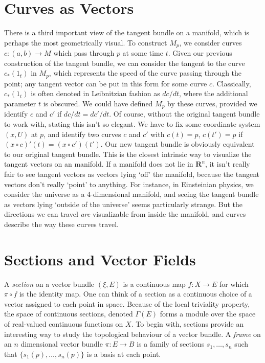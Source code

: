 \section{Curves as Vectors}

There is a third important view of the tangent bundle on a manifold, which is perhaps the most geometrically visual. To construct $M_p$, we consider curves $c: (a,b) \to M$ which pass through $p$ at some time $t$. Given our previous construction of the tangent bundle, we can consider the tangent to the curve $c_*(1_t)$ in $M_p$, which represents the speed of the curve passing through the point; any tangent vector can be put in this form for some curve $c$. Classically, $c_*(1_t)$ is often denoted in Leibnitzian fashion as $dc/dt$, where the additional parameter $t$ is obscured. We could have defined $M_p$ by these curves, provided we identify $c$ and $c'$ if $dc/dt = dc'/dt$. Of course, without the original tangent bundle to work with, stating this isn't so elegant. We have to fix some coordinate system $(x,U)$ at $p$, and identify two curves $c$ and $c'$ with $c(t) = p$, $c(t') = p$ if $(x \circ c)'(t) = (x \circ c')(t')$. Our new tangent bundle is obviously equivalent to our original tangent bundle. This is the closest intrinsic way to visualize the tangent vectors on an manifold. If a manifold does not lie in $\mathbf{R}^n$, it isn't really fair to see tangent vectors as vectors lying `off' the manifold, because the tangent vectors don't really `point' to anything. For instance, in Einsteinian physics, we consider the universe as a 4-dimensional manifold, and seeing the tangent bundle as vectors lying `outside of the universe' seems particularly strange. But the directions we can travel {\it are} visualizable from inside the manifold, and curves describe the way these curves travel.

\section{Sections and Vector Fields}

A \emph{section} on a vector bundle $(\xi,E)$ is a continuous map $f:X \to E$ for which $\pi \circ f$ is the identity map. One can think of a section as a continuous choice of a vector assigned to each point in space. Because of the local triviality property, the space of continuous sections, denoted $\Gamma(E)$ forms a module over the space of real-valued continuous functions on $X$. To begin with, sections provide an interesting way to study the topological behaviour of a vector bundle. A \emph{frame} on an $n$ dimensional vector bundle $\pi: E \to B$ is a family of sections $s_1, \dots, s_n$ such that $\{ s_1(p), \dots, s_n(p) \}$ is a basis at each point.


